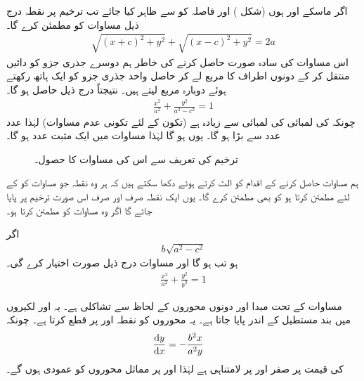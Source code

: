اگر ماسکے  اور  ہوں (شکل ) اور فاصلہ  کو  سے ظاہر کیا جائے تب ترخیم پر نقطہ  درج ذیل مساوات کو مطمئن کرے گا۔
\begin{align*}
\sqrt{(x+c)^2+y^2}+\sqrt{(x-c)^2+y^2}=2a
\end{align*}
اس مساوات کی سادہ صورت حاصل کرنے کی خاطر ہم دوسرے جذری جزو کو دائیں منتقل کر کے دونوں اطراف کا مربع لے کر حاصل واحد جذری جزو کو ایک ہاتھ رکھتے ہوئے دوبارہ مربع لیتے ہیں۔ نتیجتاً درج ذیل حاصل ہو گا۔ 
\begin{align}\label{مساوات_مخروط_ترخیم_الف}
\frac{x^2}{a^2}+\frac{y^2}{a^2-c^2}=1
\end{align} 
چونکہ  کی لمبائی  کی لمبائی سے زیادہ ہے (تکون  کے لئے تکونی عدم مساوات) لہٰذا عدد   عدد  سے بڑا ہو گا۔ یوں  ہو گا لہٰذا  مساوات  میں  ایک مثبت عدد ہو گا۔

\begin{figure}
\centering
{}
\caption{ترخیم کی تعریف سے اس کی مساوات کا حصول۔}
\label{شکل_مخروط_مساوات_ترخیم}
\end{figure}

ہم مساوات  حاصل کرنے کے اقدام کو الٹ کرتے ہوئے دکھا سکتے ہیں کہ ہر وہ نقطہ جو مساوات   کو  کے لئے مطمئن کرتا ہو  کو بھی مطمئن کرے گا۔ یوں ایک نقطہ صرف اور صرف اس صورت ترخیم پر پایا جائے گا اگر وہ مساوات  کو مطمئن کرتا ہو۔

اگر
\begin{align}\label{مساوات_مخروط_ترخیم_ب}
b\sqrt{a^2-c^2}
\end{align}
ہو تب  ہو گا اور مساوات  درج ذیل صورت اختیار کرے گی۔
\begin{align}\label{مساوات_مخروط_ترخیم_پ}
\frac{x^2}{a^2}+\frac{y^2}{b^2}=1
\end{align}

مساوات  کے تحت  مبدا اور دونوں محوروں کے لحاظ سے تشاکلی ہے۔ یہ  اور  لکیروں میں بند مستطیل کے اندر پایا جاتا ہے۔ یہ محوروں کو نقطہ  اور  پر قطع کرتا ہے۔ چونکہ
\begin{align*}
\frac{\dif y}{\dif x}&=-\frac{b^2x}{a^2y}
\end{align*}
کی قیمت  پر صفر اور  پر لامتناہی ہے  لہٰذا  اور  پر  مماثل محوروں کو عمودی ہوں گے۔

